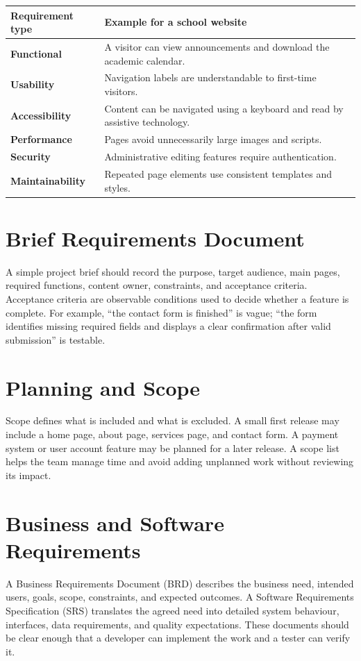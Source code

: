 \documentclass[11pt,openany,oneside]{book}
\begin{document}
\begin{center}
\begin{tabularx}{\textwidth}{>{\bfseries}p{}X}
\toprule
Requirement type & Example for a school website\\
\midrule
Functional & A visitor can view announcements and download the academic calendar.\\
Usability & Navigation labels are understandable to first-time visitors.\\
Accessibility & Content can be navigated using a keyboard and read by assistive technology.\\
Performance & Pages avoid unnecessarily large images and scripts.\\
Security & Administrative editing features require authentication.\\
Maintainability & Repeated page elements use consistent templates and styles.\\
\bottomrule
\end{tabularx}
\end{center}

\section{Brief Requirements Document}
A simple project brief should record the purpose, target audience, main pages, required functions, content owner, constraints, and acceptance criteria. Acceptance criteria are observable conditions used to decide whether a feature is complete. For example, “the contact form is finished” is vague; “the form identifies missing required fields and displays a clear confirmation after valid submission” is testable.

\section{Planning and Scope}
Scope defines what is included and what is excluded. A small first release may include a home page, about page, services page, and contact form. A payment system or user account feature may be planned for a later release. A scope list helps the team manage time and avoid adding unplanned work without reviewing its impact.


\section{Business and Software Requirements}
A Business Requirements Document (BRD) describes the business need, intended users, goals, scope, constraints, and expected outcomes. A Software Requirements Specification (SRS) translates the agreed need into detailed system behaviour, interfaces, data requirements, and quality expectations. These documents should be clear enough that a developer can implement the work and a tester can verify it.
\end{document}
